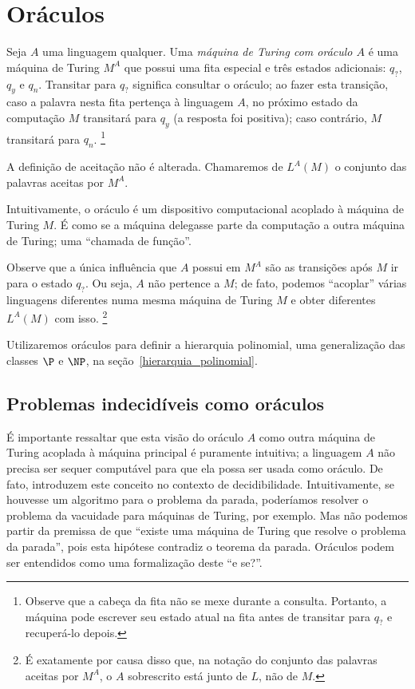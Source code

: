 \section{Oráculos}

\begin{definition}
    Seja $A$ uma linguagem qualquer.
    Uma \emph{máquina de Turing com oráculo $A$}
    é uma máquina de Turing $M^A$ que possui uma fita especial
    e três estados adicionais: $q_?$, $q_y$ e $q_n$.
    Transitar para $q_?$ significa consultar o oráculo;
    ao fazer esta transição,
    caso a palavra nesta fita pertença à linguagem $A$,
    no próximo estado da computação $M$ transitará para $q_y$
    (a resposta foi positiva);
    caso contrário, $M$ transitará para $q_n$.%
    \footnote{
        Observe que a cabeça da fita não se mexe durante a consulta.
        Portanto, a máquina pode escrever seu estado atual na fita
        antes de transitar para $q_?$ e recuperá-lo depois.
    }

    A definição de aceitação não é alterada.
    Chamaremos de $L^A(M)$ o conjunto das palavras aceitas por $M^A$.
\end{definition}

Intuitivamente, o oráculo é um dispositivo computacional
acoplado à máquina de Turing $M$.
É como se a máquina delegasse parte da computação
a outra máquina de Turing;
uma ``chamada de função''.

Observe que a única influência que $A$ possui em $M^A$
são as transições após $M$ ir para o estado $q_?$.
Ou seja, $A$ não pertence a $M$;
de fato, podemos ``acoplar'' várias linguagens diferentes
numa mesma máquina de Turing $M$
e obter diferentes $L^A(M)$ com isso.%
\footnote{
    É exatamente por causa disso que,
    na notação do conjunto das palavras aceitas por $M^A$,
    o $A$ sobrescrito está junto de $L$, não de $M$.
}

Utilizaremos oráculos para definir a hierarquia polinomial,
uma generalização das classes $\P$ e $\NP$,
na seção~\ref{hierarquia_polinomial}.

\subsection{Problemas indecidíveis como oráculos}

É importante ressaltar que esta visão do oráculo $A$
como outra máquina de Turing acoplada à máquina principal
é puramente intuitiva;
a linguagem $A$ não precisa ser sequer computável
para que ela possa ser usada como oráculo.
De fato, 
introduzem este conceito no contexto de decidibilidade.
Intuitivamente, se houvesse um algoritmo para o problema da parada,
poderíamos resolver o problema da vacuidade para máquinas de Turing,
por exemplo.
Mas não podemos partir da premissa de que
``existe uma máquina de Turing que resolve o problema da parada'',
pois esta hipótese contradiz o teorema da parada.
Oráculos podem ser entendidos como uma formalização deste ``e se?''.

